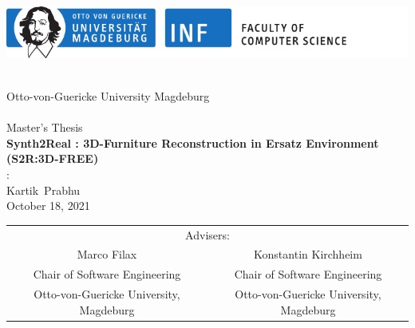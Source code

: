 \documentclass[
]{thesis}
\newcommand{\university}{Otto-von-Guericke University Magdeburg}
\newcommand{\school}{Faculty of Computer Science}
\newcommand{\logo}{\centering\includegraphics[width=0.9\linewidth]{fin-en}}
\newcommand{\advisorone}{Marco Filax}
\newcommand{\departmentone}{Chair of Software Engineering}
\newcommand{\universityone}{Otto-von-Guericke University, Magdeburg}
\newcommand{\advisortwo}{Konstantin Kirchheim}
\newcommand{\universitytwo}{Otto-von-Guericke University, Magdeburg}
\newcommand{\thesiskind}{Master's Thesis}
\newcommand{\theforename}{Kartik}
\newcommand{\thesurname}{Prabhu}
\newcommand{\thetitle}{Synth2Real : 3D-Furniture Reconstruction in Ersatz Environment \\ (S2R:3D-FREE)}
\newcommand{\thedate}{October 18, 2021}
\begin{document}
\frontmatter
\renewcommand{\proofname}{\itshape\biolinum{Proof}} %
\newcommand{\theauthor}{\theforename\ \thesurname}
\newcommand{\theauthorrev}{\thesurname,\ \theforename}
\graphicspath{{files/}}

\begin{titlepage}
    \thispagestyle{empty}
    \begin{center}
        \hbox{}\hfill
        \begin{minipage}[t]{\textwidth}
            \begin{center}
                \logo
            \end{center}
        \end{minipage}
        \hfill\hbox{}\\[0.4cm]
        {\large\university}\\[0.4cm]
        \ \\[0.4cm]
        {\large \thesiskind \\[1cm]}
        {\LARGE\bfseries \thetitle \\[1cm]}
        {\iftoggle{german}{Autor}{Author}:}\\[0.4cm]
        {\large \theauthor}\\[0.8cm]
        {\large\thedate}\\[0.8cm]

    \vspace{2cm}
    \renewcommand{\arraystretch}{.9}
    \begin{tabular}{cc}
        \multicolumn{2}{c}{\small Advisers:} \\[1mm]
        {\large \advisorone} & {\large \advisortwo} \\[2mm]
        {\small \departmentone} 			 & {\small \departmentone} \\
        {\small \universityone} 			 & {\small \universitytwo} 	\\
    \end{tabular}

    \vspace{1cm}


\end{center}
\end{titlepage}
\end{document}
